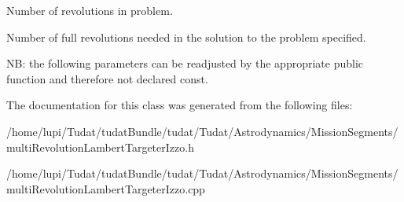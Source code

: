 Number of revolutions in problem. 

Number of full revolutions needed in the solution to the problem specified.

NB\+: the following parameters can be readjusted by the appropriate public function and therefore not declared const. 

The documentation for this class was generated from the following files\+:\begin{DoxyCompactItemize}
\item 
/home/lupi/\+Tudat/tudat\+Bundle/tudat/\+Tudat/\+Astrodynamics/\+Mission\+Segments/multi\+Revolution\+Lambert\+Targeter\+Izzo.\+h\item 
/home/lupi/\+Tudat/tudat\+Bundle/tudat/\+Tudat/\+Astrodynamics/\+Mission\+Segments/multi\+Revolution\+Lambert\+Targeter\+Izzo.\+cpp\end{DoxyCompactItemize}
